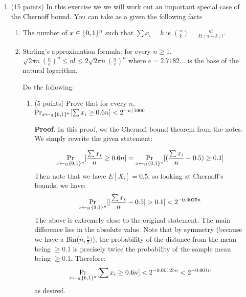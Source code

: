 \documentclass{article}
\begin{document}
\begin{enumerate}[,start=3]%

\item{}
(15 points) In this exercise we we will work out an important special case of the Chernoff bound.
You can take as a given the following facts%

\begin{enumerate}[,label=\Roman*)]%

\item{}
The number of $x \in \{0,1\}^n$ such that $\sum x_i = k$ is $\binom{n}{k} = \tfrac{n!}{k!(n-k)!}$.%

\item{}
Stirling's approximation formula: for every $n\geq 1$,
$\sqrt{2\pi n}\left(\tfrac{n}{e}\right)^n \leq n! \leq 2\sqrt{2\pi n}\left(\tfrac{n}{e}\right)^n $
  where $e=2.7182\ldots$ is the base of the natural logarithm.%

Do the following:%

\begin{enumerate}[noitemsep,topsep=\mdcompacttopsep,label=\alph*.]%

\item{}(5 points) Prove that for every $n$, $\Pr_{x\leftarrow_{\text{\tiny R}} \{0,1\}^n} [ \sum x_i \geq 0.6n ] < 2^{-n/1000}$

\begin{mdbmarginx}{1ex}{0pt}{1ex}{0pt}%
\noindent{}\textbf{Proof}.  In this proof, we the Chernoff bound theorem from the notes. We simply rewrite the given statement:%
\end{mdbmarginx}%
\noindent\noindent\[%
\Pr_{x \getsr \zo^n} [\frac{\sum x_i}{n} \geq 0.6n] = \Pr_{x \getsr \zo^n} [(\frac{\sum x_i}{n} - 0.5) \geq 0.1]
\]%
Then note that we have $E[X_i] = 0.5$, so looking at Chernoff's bounds, we have:
\noindent\noindent\[%
\Pr_{x \getsr \zo^n} [|\frac{\sum x_i}{n} - 0.5| > 0.1 ] < 2^{-0.0025n}
\]%
The above is extremely close to the original statement. The main difference lies in the absolute value. Note that by symmetry (because we have a Bin($n,\frac{1}{2})$), the probability of the distance from the mean being $\geq 0.1$ is precisely twice the probability of the sample mean being $\geq 0.1$. Therefore:
\noindent\noindent\[%
\Pr_{x \getsr \zo^n} [\sum x_i \geq 0.6n] < 2^{-0.00125n} < 2^{-0.001n} 
\]%
as desired.


\end{enumerate}
\end{enumerate}
\end{enumerate}
\end{document}
